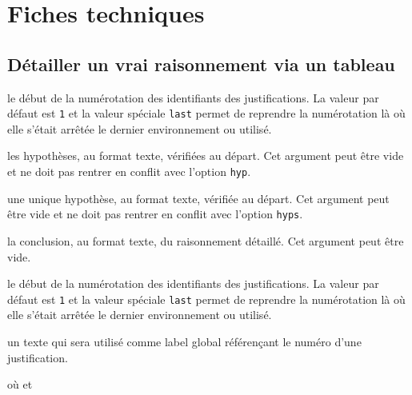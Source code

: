 \documentclass[12pt,a4paper]{article}
\begin{document}

\section{Fiches techniques}

\subsection{Détailler un \og vrai \fg{} raisonnement via un tableau}


 le début de la numérotation des identifiants des justifications.
              La valeur par défaut est \verb+1+ et la valeur spéciale \verb+last+ permet de reprendre la numérotation là où elle s'était arrêtée le dernier environnement  ou  utilisé.

 les hypothèses, au format texte, vérifiées au départ.
              Cet argument peut être vide et ne doit pas rentrer en conflit avec l'option \verb+hyp+.

 une unique hypothèse, au format texte, vérifiée au départ.
              Cet argument peut être vide et ne doit pas rentrer en conflit avec l'option \verb+hyps+.

 la conclusion, au format texte, du raisonnement détaillé.
              Cet argument peut être vide.


\separation



 le début de la numérotation des identifiants des justifications.
              La valeur par défaut est \verb+1+ et la valeur spéciale \verb+last+ permet de reprendre la numérotation là où elle s'était arrêtée le dernier environnement  ou  utilisé.


\separation



\IDoption{} un texte qui sera utilisé comme label global référençant le numéro d'une justification.


\separation


  où \quad {}
                             et 
\end{document}
